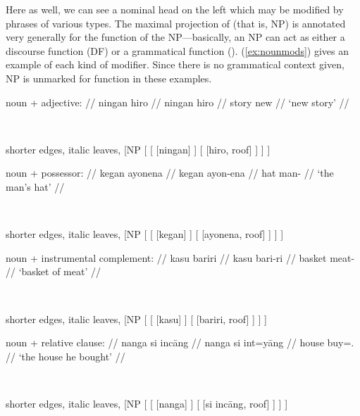Here as well, we can see a nominal head on the left which may be modified by
phrases of various types. The maximal projection of  (that is, NP) is
annotated very generally for the function of the NP---basically, an NP can act
as either a discourse function (DF) or a grammatical function (\GF{}). 
(\ref{ex:nounmods}) gives an example of each kind of modifier. Since there is 
no grammatical context given, NP is unmarked for function in these examples.

\pex\label{ex:nounmods}
\a %
	\begin{minipage}[t]{.5\remaining}
	\begingl
		\glpreamble noun + adjective: //
		\gla ningan hiro //
		\glb ningan hiro //
		\glc story new //
		\glft `new story' //
	\endgl
	\end{minipage}
	~
	\begin{forest} shorter edges, italic leaves,
	[NP
		[
			[
				[{ningan}]
			]
			[{}
				[{hiro}, roof]
			]
		]
	]
	\end{forest}

\a %
	\begin{minipage}[t]{.5\remaining}
	\begingl
		\glpreamble noun + possessor: //
		\gla kegan ayonena //
		\glb kegan ayon-ena //
		\glc hat man-\Gen{} //
		\glft `the man's hat' //
	\endgl
	\end{minipage}
	~
	\begin{forest} shorter edges, italic leaves,
	[NP
		[
			[
				[{kegan}]
			]
			[{}
				[{ayonena}, roof]
			]
		]
	]
	\end{forest}

\a %
	\begin{minipage}[t]{.5\remaining}
	\begingl
		\glpreamble noun + instrumental complement: //
		\gla kasu bariri //
		\glb kasu bari-ri //
		\glc basket meat-\Ins{} //
		\glft `basket of meat' //
	\endgl
	\end{minipage}
	~
	\begin{forest} shorter edges, italic leaves,
	[NP
		[
			[
				[{kasu}]
			]
			[{}
				[{bariri}, roof]
			]
		]
	]
	\end{forest}

\a %
	\begin{minipage}[t]{.5\remaining}
	\begingl
		\glpreamble noun + relative clause: //
		\gla nanga si incāng //
		\glb nanga si int=yāng //
		\glc house \Rel{} buy=\TsgM{}.\Aarg{} //
		\glft `the house he bought' //
	\endgl
	\end{minipage}
	~
	\begin{forest} shorter edges, italic leaves,
	[NP
		[
			[
				[{nanga}]
			]
			[{}
				[{si incāng}, roof]
			]
		]
	]
	\end{forest}

